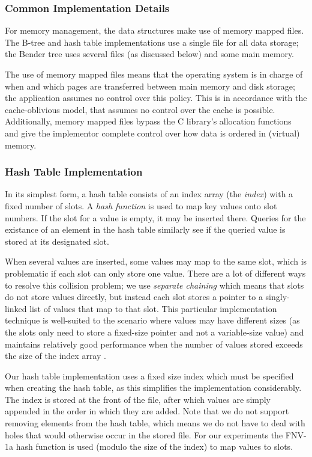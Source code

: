 \documentclass{acm_proc_article-sp}
\begin{document}
\subsubsection{Common Implementation Details}
For memory management, the data structures make use of memory mapped files.
The B-tree and hash table implementations use a single file for all data storage;
the Bender tree uses several files (as discussed below) and some main memory.

The use of memory mapped files means that the operating system is in charge of
when and which pages are transferred between main memory and disk storage; the
application assumes no control over this policy. This is in accordance with the
cache-oblivious model, that assumes no control over the cache is possible.
Additionally, memory mapped files bypass the C library's allocation functions
and give the implementor complete control over how data is ordered in (virtual)
memory.

\subsubsection{Hash Table Implementation}
In its simplest form, a hash table consists of an
index array (the \emph{index}) with a fixed number of slots. A \emph{hash
function} is used to map key values onto slot numbers. If the slot for a value
is empty, it may be inserted there. Queries for the existance of an element in
the hash table similarly see if the queried value is stored at its designated
slot.

When several values are inserted, some values may map to the same slot,
which is problematic if each slot can only store one value. There
are a lot of different ways to resolve this collision problem; we use
\emph{separate chaining} which means that slots do not store values directly,
but instead each slot stores a pointer to a singly-linked list of values that
map to that slot. This particular implementation technique is well-suited to
the scenario where values may have different sizes (as the slots only need to
store a fixed-size pointer and not a variable-size value) and maintains
relatively good performance when the number of values stored exceeds the size
of the index array \cite{sedgewick1998ac}.


Our hash table implementation uses a fixed size index which must be specified
when creating the hash table, as this simplifies the implementation
considerably. The index is stored at the front of the file, after which values
are simply appended in the order in which they are added. Note that we do not
support removing elements from the hash table, which means we do not have to
deal with holes that would otherwise occur in the stored file. For our
experiments the FNV-1a hash function \cite{noll2004fnv} is used (modulo the
size of the index) to map values to slots.
\end{document}
